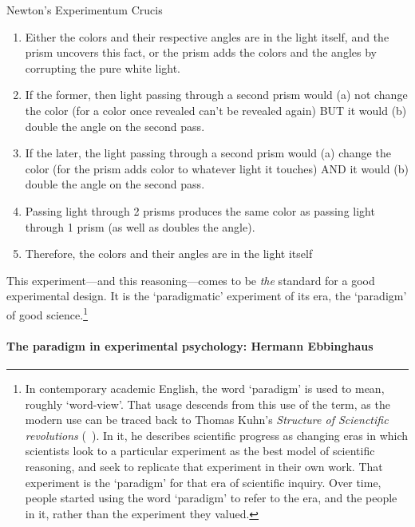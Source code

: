 \begin{refsection}
\begin{apatextbox}{Newton's Experimentum Crucis} 

\begin{enumerate}
\item Either the colors and their respective angles are in the light itself, and the prism uncovers this fact, or the prism adds the colors and the angles by corrupting the pure white light.

\item If the former, then light passing through a second prism would (a) not change the color (for a color once revealed can't be revealed again) BUT it would (b) double the angle on the second pass.

\item If the later, the light passing through a second prism would (a) change the color (for the prism adds color to whatever light it touches) AND it would (b) double the angle on the second pass.

\item Passing light through 2 prisms produces the same color as passing light through 1 prism (as well as doubles the angle).

\item Therefore, the colors and their angles are in the light itself 

\end{enumerate}

\end{apatextbox}

This experiment---and this reasoning---comes to be \emph{the} standard for a good experimental design. It is the `paradigmatic' experiment of its era, the `paradigm' of good science.\footnote{In contemporary academic English, the word `paradigm' is used to mean, roughly `word-view'. That usage descends from this use of the term, as the modern use can be traced back to Thomas Kuhn's \emph{Structure of Scienctific revolutions} (~\citep{Kuhn:1996fi}). In it, he describes scientific progress as changing eras in which scientists look to a particular experiment as the best model of scientific reasoning, and seek to replicate that experiment in their own work. That experiment is the `paradigm' for that era of scientific inquiry. Over time, people started using the word `paradigm' to refer to the era, and the people in it, rather than the experiment they valued.} 

\paragraph{The paradigm in experimental psychology: Hermann Ebbinghaus}
\label{theparadigminexperimentalpsychology:hermannebbinghaus}


\end{refsection}
